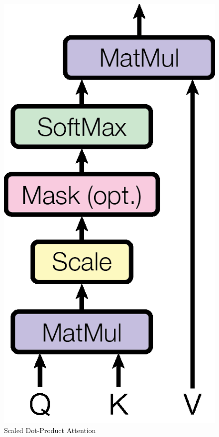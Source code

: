 \begin{minipage}[]{\textwidth}
\centering
\begin{minipage}[ht]{.35\textwidth}
    \centering
    \begin{figure}[H]
        \centering
        \includegraphics[width=.48\textwidth]{literature/imgs/ext-attention-dot-product.png}
        \caption{Scaled Dot-Product Attention \cite{vaswani2017attention}}
        \label{fig:ext-attention-dot-product}
    \end{figure}
    \vspace*{-.5cm}
    \begin{figure}[H]
        \centering

\end{figure}
\end{minipage}
\end{minipage}
